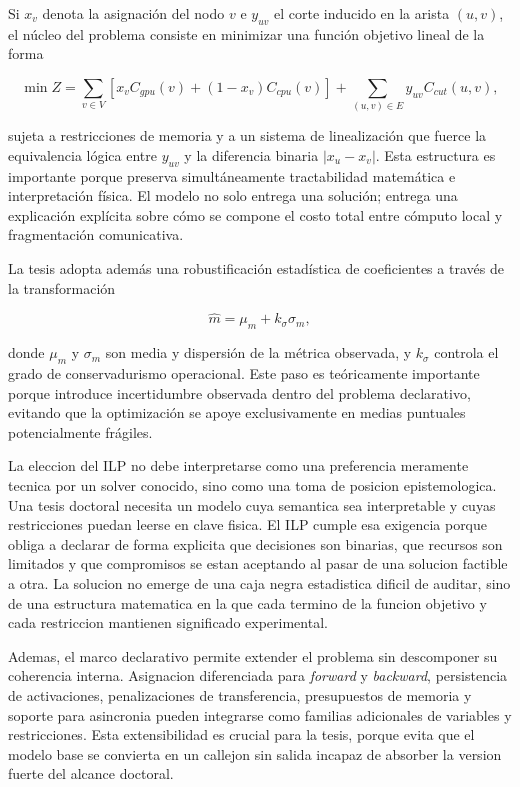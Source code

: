 Si $x_v$ denota la asignación del nodo $v$ e $y_{uv}$ el corte inducido en la arista $(u,v)$, el núcleo del problema consiste en minimizar una función objetivo lineal de la forma

$$
\min Z = \sum_{v \in V}\left[x_v C_{gpu}(v) + (1-x_v) C_{cpu}(v)\right] + \sum_{(u,v)\in E} y_{uv} C_{cut}(u,v),
$$

sujeta a restricciones de memoria y a un sistema de linealización que fuerce la equivalencia lógica entre $y_{uv}$ y la diferencia binaria $|x_u - x_v|$. Esta estructura es importante porque preserva simultáneamente tractabilidad matemática e interpretación física. El modelo no solo entrega una solución; entrega una explicación explícita sobre cómo se compone el costo total entre cómputo local y fragmentación comunicativa.

La tesis adopta además una robustificación estadística de coeficientes a través de la transformación

$$
\hat{m} = \mu_m + k_\sigma \sigma_m,
$$

donde $\mu_m$ y $\sigma_m$ son media y dispersión de la métrica observada, y $k_\sigma$ controla el grado de conservadurismo operacional. Este paso es teóricamente importante porque introduce incertidumbre observada dentro del problema declarativo, evitando que la optimización se apoye exclusivamente en medias puntuales potencialmente frágiles.

La eleccion del ILP no debe interpretarse como una preferencia meramente tecnica por un solver conocido, sino como una toma de posicion epistemologica. Una tesis doctoral necesita un modelo cuya semantica sea interpretable y cuyas restricciones puedan leerse en clave fisica. El ILP cumple esa exigencia porque obliga a declarar de forma explicita que decisiones son binarias, que recursos son limitados y que compromisos se estan aceptando al pasar de una solucion factible a otra. La solucion no emerge de una caja negra estadistica dificil de auditar, sino de una estructura matematica en la que cada termino de la funcion objetivo y cada restriccion mantienen significado experimental.

Ademas, el marco declarativo permite extender el problema sin descomponer su coherencia interna. Asignacion diferenciada para \textit{forward} y \textit{backward}, persistencia de activaciones, penalizaciones de transferencia, presupuestos de memoria y soporte para asincronia pueden integrarse como familias adicionales de variables y restricciones. Esta extensibilidad es crucial para la tesis, porque evita que el modelo base se convierta en un callejon sin salida incapaz de absorber la version fuerte del alcance doctoral.

